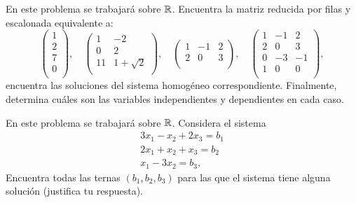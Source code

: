 \documentclass[12pt,a4paper]{book}
\begin{document}
    \begin{ejercicio}
        En este problema se trabajará sobre $\mathbb{R}$. Encuentra la matriz reducida por filas y escalonada equivalente a:
        \begin{equation*}
        \begin{pmatrix}
            1\\
            2\\
            7\\
            0\\
        \end{pmatrix},
        \quad
        \begin{pmatrix}
            1 & -2 \\
            0 & 2 \\
            11 & 1 + \sqrt{2}\\
        \end{pmatrix},
        \quad
        \begin{pmatrix}
            1 & -1 & 2\\
            2 & 0 & 3\\
        \end{pmatrix},
        \quad
        \begin{pmatrix}
            1 & -1 & 2\\
            2 & 0 & 3\\
            0 & -3 & -1\\
            1 & 0 & 0\\
        \end{pmatrix},
        \end{equation*}
        encuentra las soluciones del sistema homogéneo correspondiente. Finalmente, determina cuáles son las variables independientes y dependientes en cada caso.
    \end{ejercicio}

    \begin{ejercicio}
        En este problema se trabajará sobre $\mathbb{R}$. Considera el sistema
        \begin{align*}
            3x_{1} - x_{2} + 2x_{3} = b_{1}\\
            2x_{1} + x_{2} + x_{3} = b_{2}\\
            x_{1} - 3x_{2} = b_{3},
        \end{align*}
        Encuentra todas las ternas $(b_{1}, b_{2}, b_{3})$ para las que el sistema tiene alguna solución (justifica tu respuesta).
    \end{ejercicio}
\end{document}
